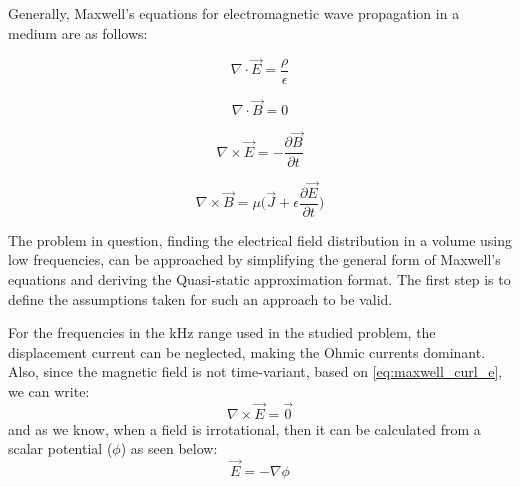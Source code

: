 Generally, Maxwell's equations for electromagnetic wave propagation in a medium are as follows:
\begin{center}
\begin{minipage}{.35\linewidth}
    \begin{equation}
        \nabla\cdot\vec{E}=\dfrac{\rho}{\epsilon}
    \end{equation}
\end{minipage}
\begin{minipage}{.35\linewidth}
    \begin{equation}
        \nabla\cdot\vec{B} = 0
    \end{equation}
\end{minipage}\break
\begin{minipage}{.35\linewidth}
    \begin{equation}
        \label{eq:maxwell_curl_e}
        \nabla\times\vec{E}=-\dfrac{\partial\vec{B}}{\partial t}
    \end{equation}
\end{minipage}
\begin{minipage}{.35\linewidth}
    \begin{equation}
        \nabla\times\vec{B} = \mu\Bigg(\vec{J} + \epsilon\dfrac{\partial\vec{E}}{\partial t}\Bigg)
    \end{equation}
\end{minipage}
\end{center}

\noindent The problem in question, finding the electrical field distribution in a volume using low frequencies, can be approached by simplifying the general form of Maxwell's equations and deriving the Quasi-static approximation format. The first step is to define the assumptions taken for such an approach to be valid.

For the frequencies in the \si{kHz} range used in the studied problem, the displacement current can be neglected, making the Ohmic currents dominant. Also, since the magnetic field is not time-variant, based on \autoref{eq:maxwell_curl_e}, we can write:
\begin{equation}
    \label{eq:curl_zero_e_field}
    \nabla\times\vec{E} = \vec{0}
\end{equation}
and as we know, when a field is irrotational, then it can be calculated from a scalar potential ($\phi$) as seen below:
\begin{equation}
    \label{eq:e_field_from_potential}
    \boxed{\vec{E} = -\nabla\phi}
\end{equation}

